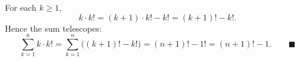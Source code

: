 For each $k\ge1$,
\[
k\cdot k!=(k+1)\cdot k!-k!=(k+1)!-k! .
\]
Hence the sum telescopes:
\[
\sum_{k=1}^{n}k\cdot k!=\sum_{k=1}^{n}\bigl((k+1)!-k!\bigr)=(n+1)!-1!=(n+1)!-1 .\qquad\blacksquare
\]
